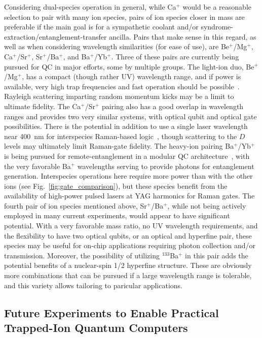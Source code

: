\documentclass[%
12pt,
 amsmath,amssymb,
]{revtex4-2}
\begin{document}
Considering dual-species operation in general, while Ca$^{+}$ would be a reasonable selection to pair with many ion species, pairs of ion species closer in mass are preferable if the main goal is for a sympathetic coolant and/or syndrome-extraction/entanglement-transfer ancilla.  Pairs that make sense in this regard, as well as when considering wavelength similarities (for ease of use), are Be$^{+}$/Mg$^{+}$, Ca$^{+}$/Sr$^{+}$, Sr$^{+}$/Ba$^{+}$, and Ba$^{+}$/Yb$^{+}$.  Three of these pairs are currently being pursued for QC in major efforts, some by multiple groups.  The light-ion duo, Be$^{+}$/Mg$^{+}$, has a compact (though rather UV) wavelength range, and if power is available, very high trap frequencies and fast operation should be possible~\cite{TanMultiElement2015}.  Rayleigh scattering imparting random momentum kicks may be a limit to ultimate fidelity. The Ca$^{+}$/Sr$^{+}$ pairing also has a good overlap in wavelength ranges and provides two very similar systems, with optical qubit and optical gate possibilities.  There is the potential in addition to use a single laser wavelength near 400~nm for interspecies Raman-based logic~\cite{BallanceThesis2014}, though scattering to the $D$ levels may ultimately limit Raman-gate fidelity.  The heavy-ion pairing Ba$^{+}$/Yb$^{+}$ is being pursued for remote-entanglement in a modular QC architecture~\cite{InlekMultiNode2017}, with the very favorable Ba$^{+}$ wavelengths serving to provide photons for entanglement generation.  Interspecies operations here require more power than with the other ions (see Fig.~\ref{fig:gate_comparison}), but these species benefit from the availability of high-power pulsed lasers at YAG harmonics for Raman gates.  The fourth pair of ion species mentioned above, Sr$^{+}$/Ba$^{+}$, while not being actively employed in many current experiments, would appear to have significant potential. With a very favorable mass ratio, no UV wavelength requirements, and the flexibility to have two optical qubits, or an optical and hyperfine pair, these species may be useful for on-chip applications requiring photon collection and/or transmission.  Moreover, the possibility of utilizing $^{133}$Ba$^{+}$ in this pair adds the potential benefits of a nuclear-spin 1/2 hyperfine structure.  These are obviously more combinations that can be pursued if a large wavelength range is tolerable, and this variety allows tailoring to paricular applications.

\subsection{Future Experiments to Enable Practical Trapped-Ion Quantum Computers}
\end{document}
